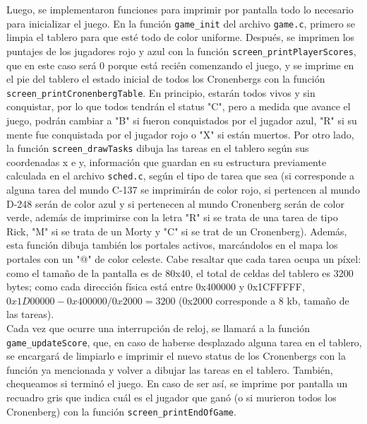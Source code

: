 \documentclass[a4paper]{article}
\begin{document}
Luego, se implementaron funciones para imprimir por pantalla todo lo necesario para inicializar el juego. En la función {\tt game_init} del archivo {\tt game.c}, primero se limpia el tablero para que esté todo de color uniforme. Después, se imprimen los puntajes de los jugadores rojo y azul con la función {\tt screen_printPlayerScores}, que en este caso será 0 porque está recién comenzando el juego, y se imprime en el pie del tablero el estado inicial de todos los Cronenbergs con la función {\tt screen_printCronenbergTable}. En principio, estarán todos vivos y sin conquistar, por lo que todos tendrán el status "C", pero a medida que avance el juego, podrán cambiar a "B" si fueron conquistados por el jugador azul, "R" si su mente fue conquistada por el jugador rojo o "X" si están muertos. Por otro lado, la función {\tt screen_drawTasks} dibuja las tareas en el tablero según sus coordenadas x e y, información que guardan en su estructura previamente calculada en el archivo {\tt sched.c}, según el tipo de tarea que sea (si corresponde a alguna tarea del mundo C-137 se imprimirán de color rojo, si pertencen al mundo D-248 serán de color azul y si pertenecen al mundo Cronenberg serán de color verde, además de imprimirse con la letra "R" si se trata de una tarea de tipo Rick, "M" si se trata de un Morty y "C" si se trat de un Cronenberg). Además, esta función dibuja también los portales activos, marcándolos en el mapa los portales con un "@" de color celeste. Cabe resaltar que cada tarea ocupa un píxel: como el tamaño de la pantalla es de 80x40, el total de celdas del tablero es 3200 bytes; como cada dirección física está entre 0x400000 y 0x1CFFFFF, $0x1D00000 - 0x400000 / 0x2000 = 3200$ (0x2000 corresponde a 8 kb, tamaño de las tareas). \\
Cada vez que ocurre una interrupción de reloj, se llamará a la función {\tt game_updateScore}, que, en caso de haberse desplazado alguna tarea en el tablero, se encargará de limpiarlo e imprimir el nuevo status de los Cronenbergs con la función ya mencionada y volver a dibujar las tareas en el tablero. También, chequeamos si terminó el juego. En caso de ser así, se imprime por pantalla un recuadro gris que indica cuál es el jugador que ganó (o si murieron todos los Cronenberg) con la función {\tt screen_printEndOfGame}.
\end{document}
